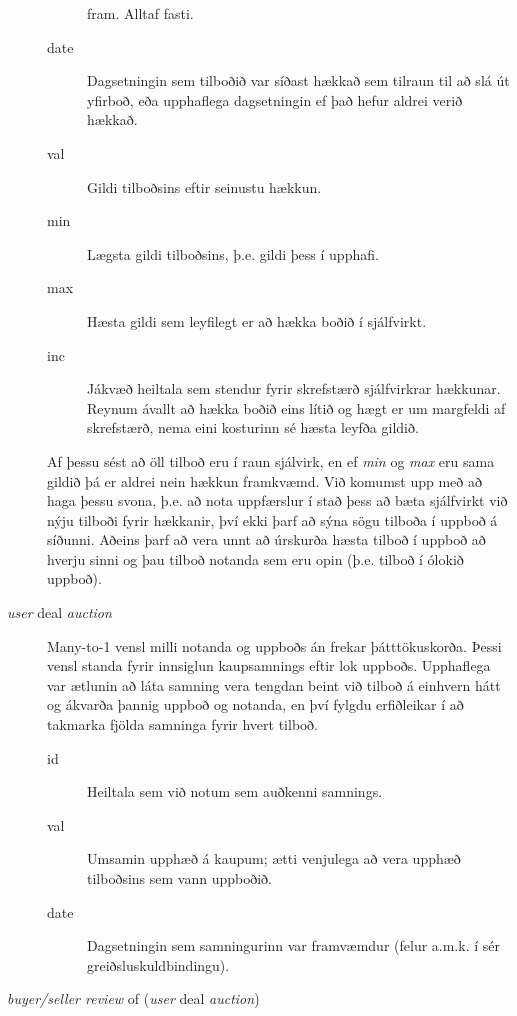 \documentclass[a4paper,icelandic]{article}
\theoremstyle{definition} \newtheorem{skilgr}{Skilgreining}
\theoremstyle{plain}      \newtheorem{setn}{Setning}
\theoremstyle{remark}     \newtheorem*{lausn}{Lausn}
\begin{document}
\begin{description}
\begin{description}
                fram. Alltaf fasti.
            \item[date] Dagsetningin sem tilboðið var síðast hækkað sem tilraun
                til að slá út yfirboð, eða upphaflega dagsetningin ef það hefur
                aldrei verið hækkað.
            \item[val] Gildi tilboðsins eftir seinustu hækkun.
            \item[min] Lægsta gildi tilboðsins, þ.e. gildi þess í upphafi.
            \item[max] Hæsta gildi sem leyfilegt er að hækka boðið í sjálfvirkt. 
            \item[inc] Jákvæð heiltala sem stendur fyrir skrefstærð sjálfvirkrar
                hækkunar. Reynum ávallt að hækka boðið eins lítið og hægt er um
                margfeldi af skrefstærð, nema eini kosturinn sé hæsta leyfða
                gildið.
        \end{description}
        Af þessu sést að öll tilboð eru í raun sjálvirk, en ef \emph{min} og
        \emph{max} eru sama gildið þá er aldrei nein hækkun framkvæmd. Við
        komumst upp með að haga þessu svona, þ.e. að nota uppfærslur í stað þess
        að bæta sjálfvirkt við nýju tilboði fyrir hækkanir, því ekki þarf að
        sýna sögu tilboða í uppboð á síðunni. Aðeins þarf að vera unnt að
        úrskurða hæsta tilboð í uppboð að hverju sinni og þau tilboð notanda sem
        eru opin (þ.e. tilboð í ólokið uppboð).
    \item[\emph{user} deal \emph{auction}] Many-to-1 vensl milli notanda og
        uppboðs án frekar þátttökuskorða. Þessi vensl standa fyrir innsiglun
        kaupsamnings eftir lok uppboðs. Upphaflega var ætlunin að láta samning
        vera tengdan beint við tilboð á einhvern hátt og ákvarða þannig uppboð
        og notanda, en því fylgdu erfiðleikar í að takmarka fjölda samninga
        fyrir hvert tilboð.
        \begin{description}
            \item[id] Heiltala sem við notum sem auðkenni samnings.
            \item[val] Umsamin upphæð á kaupum; ætti venjulega að vera upphæð
                tilboðsins sem vann uppboðið.
            \item[date] Dagsetningin sem samningurinn var framvæmdur (felur
                a.m.k. í sér greiðsluskuldbindingu).
        \end{description}
    \item[\emph{buyer/seller review} of (\emph{user} deal \emph{auction})]

\end{description}
\end{document}
